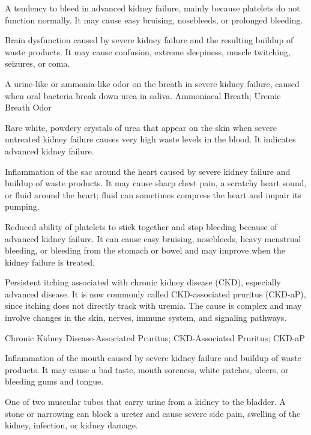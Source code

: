  A tendency to bleed in advanced kidney failure, mainly because platelets do not function normally. It may cause easy bruising, nosebleeds, or prolonged bleeding.

 Brain dysfunction caused by severe kidney failure and the resulting buildup of waste products. It may cause confusion, extreme sleepiness, muscle twitching, seizures, or coma.

 A urine-like or ammonia-like odor on the breath in severe kidney failure, caused when oral bacteria break down urea in saliva.
\synonyms
Ammoniacal Breath; Uremic Breath Odor

 Rare white, powdery crystals of urea that appear on the skin when severe untreated kidney failure causes very high waste levels in the blood. It indicates advanced kidney failure.

 Inflammation of the sac around the heart caused by severe kidney failure and buildup of waste products. It may cause sharp chest pain, a scratchy heart sound, or fluid around the heart; fluid can sometimes compress the heart and impair its pumping.

 Reduced ability of platelets to stick together and stop bleeding because of advanced kidney failure. It can cause easy bruising, nosebleeds, heavy menstrual bleeding, or bleeding from the stomach or bowel and may improve when the kidney failure is treated.

 Persistent itching associated with chronic kidney disease (CKD), especially advanced disease. It is now commonly called CKD-associated pruritus (CKD-aP), since itching does not directly track with uremia. The cause is complex and may involve changes in the skin, nerves, immune system, and signaling pathways.

\synonyms
Chronic Kidney Disease-Associated Pruritus; CKD-Associated Pruritus; CKD-aP

 Inflammation of the mouth caused by severe kidney failure and buildup of waste products. It may cause a bad taste, mouth soreness, white patches, ulcers, or bleeding gums and tongue.

 One of two muscular tubes that carry urine from a kidney to the bladder. A stone or narrowing can block a ureter and cause severe side pain, swelling of the kidney, infection, or kidney damage.

